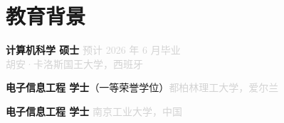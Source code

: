 \documentclass[8.5pt, a4paper]{article}
\begin{document}

\section{教育背景}

\noindent\textbf{计算机科学 硕士} \hfill \textcolor{lightgray}{预计 2026 年 6 月毕业}\\
\textcolor{lightgray}{胡安·卡洛斯国王大学，西班牙}

\vspace{3pt}
\noindent\textbf{电子信息工程 学士}（一等荣誉学位）\hfill \textcolor{lightgray}{都柏林理工大学，爱尔兰}

\vspace{3pt}
\noindent\textbf{电子信息工程 学士} \hfill \textcolor{lightgray}{南京工业大学，中国}
\end{document}
